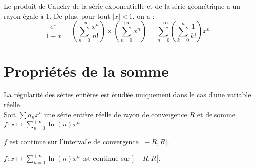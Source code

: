\documentclass{book}
\begin{document}
\begin{Exemple}
Le produit de Cauchy de la série exponentielle et de la série géométrique a un rayon égale à 1. De plus, pour tout $|x|<1$, on a :
$$\frac{e^x}{1-x}= \left(\sum_{n=0}^{+\infty} \frac{x^n}{n!}\right) \times \left(\sum_{n=0}^{+\infty} x^n\right)=\sum_{n=0}^{+\infty} \left(\sum_{k=0}^n\frac{1}{k!}\right)x^n .$$
\end{Exemple}

\section{Propriétés de la somme}
La régularité des séries entières est étudiée uniquement dans le cas d'une  variable réelle.\\
Soit $\sum a_n x^n $ une série entière réelle de rayon de convergence $R$ et de somme $f:x\mapsto \sum\limits_{n=0}^{+\infty}\ln(n)x^n$.
\begin{Theoreme}[continuité]
$f$ est continue sur l'intervalle de convergence $]-R,R[$.
\end{Theoreme}
\begin{Exemple}
$f:x\mapsto\sum\limits_{n=0}^{+\infty} \ln(n) x^{n}$ est continue sur $]-R,R[$.
\end{Exemple}
\end{document}
